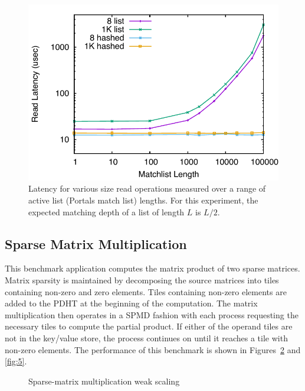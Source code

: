 \begin{figure}
    \centering
    \includegraphics[width=.95\linewidth]{plots/mlen}
    \caption{Latency for various size read operations measured over a range of active list (Portals match list) lengths. For this experiment, the expected matching depth of a list of length $L$ is $L/2$.}
    \label{fig:mlen}
\end{figure}


\subsection{Sparse Matrix Multiplication}

This benchmark application computes the matrix product of two sparse 
matrices. Matrix sparsity is maintained by decomposing the source
matrices into tiles containing non-zero and zero elements. Tiles 
containing non-zero elements are added to the PDHT at the beginning of
the computation. The matrix multiplication then operates in a SPMD
fashion with each process requesting the necessary tiles to compute
the partial product. If either of the operand tiles are not in the
key/value store, the process continues on until it reaches a tile 
with non-zero elements. The performance of this benchmark is shown in
Figures~\ref{fig:4} and \ref{fig:5}.

\begin{figure}[ht]
  \center
  \fbox{\rule{2.5in}{0pt}\rule[-2.5in]{0pt}{4ex}}  
  \caption{Sparse-matrix multiplication weak scaling}
  \label{fig:4}
\end{figure}


